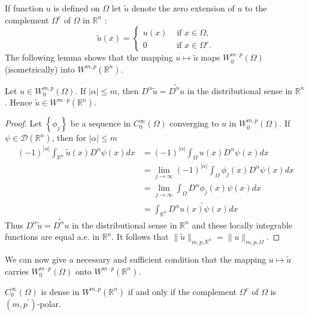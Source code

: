 \begin{para}
  If function $u$ is defined on $\Omega$ let $\tilde{u}$ denote the zero extension of $u$ to the complement $\Omega^c$ of $\Omega$ in $\mathbb{R}^n$ :
  \[
  \tilde{u}(x)= \begin{cases}u(x) & \text { if } x \in \Omega, \\ 0 & \text { if } x \in \Omega^c .\end{cases}
  \]
  The following lemma shows that the mapping $u \mapsto \tilde{u}$ maps $W_0^{m \cdot p}(\Omega)$ (isometrically) into $W^{m, p}\left(\mathbb{R}^n\right)$.
\end{para}

\begin{lemma}
  Let $u \in W_0^{m, p}(\Omega)$. If $|\alpha| \leq m$, then $D^\alpha \tilde{u}=\widetilde{D^\alpha u}$ in the distributional sense in $\mathbb{R}^n$. Hence $\tilde{u} \in W^{m \cdot p}\left(\mathbb{R}^n\right)$.
\end{lemma}

\begin{proof}
  Let $\left\{\phi_j\right\}$ be a sequence in $C_0^{\infty}(\Omega)$ converging to $u$ in $W_0^{m, p}(\Omega)$. If $\psi \in \mathscr{D}\left(\mathbb{R}^n\right)$, then for $|\alpha| \leq m$
  \[
  \begin{aligned}
  (-1)^{|\alpha|} \int_{\mathbb{R}^n} \tilde{u}(x) D^\alpha \psi(x) d x & =(-1)^{|\alpha|} \int_{\Omega} u(x) D^\alpha \psi(x) d x \\
  & =\lim _{j \rightarrow \infty}(-1)^{|\alpha|} \int_{\Omega} \phi_j(x) D^\alpha \psi(x) d x \\
  & =\lim _{j \rightarrow \infty} \int_{\Omega} D^\alpha \phi_j(x) \psi(x) d x \\
  & =\int_{\mathbb{R}^n} \widetilde{D^\alpha u(x) \psi(x) d x}
  \end{aligned}
  \]
  Thus $D^\alpha \tilde{u}=\widetilde{D^\alpha u}$ in the distributional sense in $\mathbb{R}^n$ and these locally integrable functions are equal a.e. in $\mathbb{R}^n$. It follows that $\|\tilde{u}\|_{m, p, \mathbb{R}^n}=\|u\|_{m, p, \Omega}$.
\end{proof}

We can now give a necessary and sufficient condition that the mapping $u \mapsto \tilde{u}$ carries $W_0^{m \cdot p}(\Omega)$ onto $W^{m \cdot p}\left(\mathbb{R}^n\right)$.

\begin{theorem}
  $C_0^{\infty}(\Omega)$ is dense in $W^{m, p}\left(\mathbb{R}^n\right)$ if and only if the complement $\Omega^c$ of $\Omega$ is $\left(m, p^{\prime}\right)$-polar.
\end{theorem}

